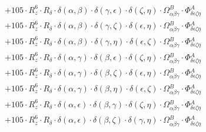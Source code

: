 \documentclass{article}
\begin{document}
\begin{equation}
\begin{array}{c}
 \\[0.2em] 		 + 105 \cdot R_{z}^{6} \cdot R_{\delta{}} \cdot \delta{}\left(\alpha{}, \beta{}\right) \cdot \delta{}\left(\gamma{}, \epsilon{}\right) \cdot \delta{}\left(\zeta{}, \eta{}\right) \cdot \Omega{}^{B}_{\alpha{}\beta{}\gamma{}} \cdot \Phi{}^{A}_{\delta{}\epsilon{}\zeta{}\eta{}} 
 \\[0.2em] 		 + 105 \cdot R_{z}^{6} \cdot R_{\delta{}} \cdot \delta{}\left(\alpha{}, \beta{}\right) \cdot \delta{}\left(\gamma{}, \zeta{}\right) \cdot \delta{}\left(\epsilon{}, \eta{}\right) \cdot \Omega{}^{B}_{\alpha{}\beta{}\gamma{}} \cdot \Phi{}^{A}_{\delta{}\epsilon{}\zeta{}\eta{}} 
 \\[0.2em] 		 + 105 \cdot R_{z}^{6} \cdot R_{\delta{}} \cdot \delta{}\left(\alpha{}, \beta{}\right) \cdot \delta{}\left(\gamma{}, \eta{}\right) \cdot \delta{}\left(\epsilon{}, \zeta{}\right) \cdot \Omega{}^{B}_{\alpha{}\beta{}\gamma{}} \cdot \Phi{}^{A}_{\delta{}\epsilon{}\zeta{}\eta{}} 
 \\[0.2em] 		 + 105 \cdot R_{z}^{6} \cdot R_{\delta{}} \cdot \delta{}\left(\alpha{}, \gamma{}\right) \cdot \delta{}\left(\beta{}, \epsilon{}\right) \cdot \delta{}\left(\zeta{}, \eta{}\right) \cdot \Omega{}^{B}_{\alpha{}\beta{}\gamma{}} \cdot \Phi{}^{A}_{\delta{}\epsilon{}\zeta{}\eta{}} 
 \\[0.2em] 		 + 105 \cdot R_{z}^{6} \cdot R_{\delta{}} \cdot \delta{}\left(\alpha{}, \gamma{}\right) \cdot \delta{}\left(\beta{}, \zeta{}\right) \cdot \delta{}\left(\epsilon{}, \eta{}\right) \cdot \Omega{}^{B}_{\alpha{}\beta{}\gamma{}} \cdot \Phi{}^{A}_{\delta{}\epsilon{}\zeta{}\eta{}} 
 \\[0.2em] 		 + 105 \cdot R_{z}^{6} \cdot R_{\delta{}} \cdot \delta{}\left(\alpha{}, \gamma{}\right) \cdot \delta{}\left(\beta{}, \eta{}\right) \cdot \delta{}\left(\epsilon{}, \zeta{}\right) \cdot \Omega{}^{B}_{\alpha{}\beta{}\gamma{}} \cdot \Phi{}^{A}_{\delta{}\epsilon{}\zeta{}\eta{}} 
 \\[0.2em] 		 + 105 \cdot R_{z}^{6} \cdot R_{\delta{}} \cdot \delta{}\left(\alpha{}, \epsilon{}\right) \cdot \delta{}\left(\beta{}, \gamma{}\right) \cdot \delta{}\left(\zeta{}, \eta{}\right) \cdot \Omega{}^{B}_{\alpha{}\beta{}\gamma{}} \cdot \Phi{}^{A}_{\delta{}\epsilon{}\zeta{}\eta{}} 
 \\[0.2em] 		 + 105 \cdot R_{z}^{6} \cdot R_{\delta{}} \cdot \delta{}\left(\alpha{}, \epsilon{}\right) \cdot \delta{}\left(\beta{}, \zeta{}\right) \cdot \delta{}\left(\gamma{}, \eta{}\right) \cdot \Omega{}^{B}_{\alpha{}\beta{}\gamma{}} \cdot \Phi{}^{A}_{\delta{}\epsilon{}\zeta{}\eta{}} 

\end{array}
\end{equation}
\end{document}
